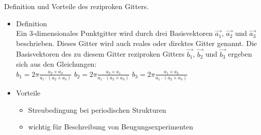\documentclass[a5paper,12pt,ngerman,grid=front %
,print
]{kartei}
\begin{document}
	\begin{karte}{
		Definition und Vorteile des reziproken Gitters.
		}
		
		\begin{itemize}
			\item Definition \\
				Ein 3-dimensionales Punktgitter wird durch drei Basisvektoren $\vec {a_1}$, $\vec {a_2}$ und $\vec {a_3}$ beschrieben. Dieses Gitter wird auch reales oder direktes Gitter genannt. Die Basisvektoren des zu diesem Gitter reziproken Gitters $\vec {b_1}$, $\vec {b_2}$ und $\vec {b_3}$ ergeben sich aus den Gleichungen: \\
				$ b_1 = 2 \pi \frac{  a_2 \times a_3  }{ a_1 \cdot ( a_2 \times a_3 ) } $
				$ b_2 = 2 \pi \frac{  a_3 \times a_1  }{ a_1 \cdot ( a_2 \times a_3 ) } $
				$ b_3 = 2 \pi \frac{  a_1 \times a_2  }{ a_1 \cdot ( a_2 \times a_3 ) } $
				
			\item Vorteile 
				\begin{itemize}
					\item Streubedingung bei periodischen Strukturen
					\item wichtig für Beschreibung von Beugungsexperimenten
				\end{itemize}
		\end{itemize}
		
	\end{karte}
\end{document}
